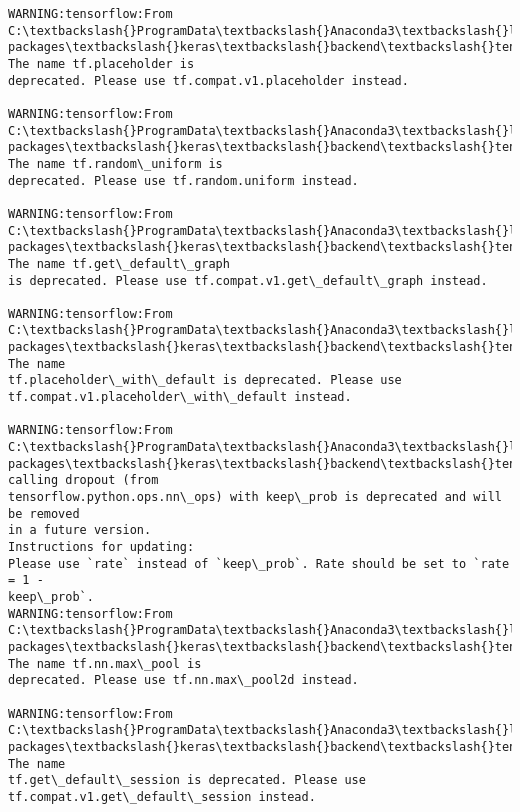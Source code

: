 \documentclass[11pt]{article}
\begin{document}
    \begin{Verbatim}[commandchars=\\\{\}]
WARNING:tensorflow:From C:\textbackslash{}ProgramData\textbackslash{}Anaconda3\textbackslash{}lib\textbackslash{}site-
packages\textbackslash{}keras\textbackslash{}backend\textbackslash{}tensorflow\_backend.py:517: The name tf.placeholder is
deprecated. Please use tf.compat.v1.placeholder instead.

WARNING:tensorflow:From C:\textbackslash{}ProgramData\textbackslash{}Anaconda3\textbackslash{}lib\textbackslash{}site-
packages\textbackslash{}keras\textbackslash{}backend\textbackslash{}tensorflow\_backend.py:4138: The name tf.random\_uniform is
deprecated. Please use tf.random.uniform instead.

WARNING:tensorflow:From C:\textbackslash{}ProgramData\textbackslash{}Anaconda3\textbackslash{}lib\textbackslash{}site-
packages\textbackslash{}keras\textbackslash{}backend\textbackslash{}tensorflow\_backend.py:131: The name tf.get\_default\_graph
is deprecated. Please use tf.compat.v1.get\_default\_graph instead.

WARNING:tensorflow:From C:\textbackslash{}ProgramData\textbackslash{}Anaconda3\textbackslash{}lib\textbackslash{}site-
packages\textbackslash{}keras\textbackslash{}backend\textbackslash{}tensorflow\_backend.py:133: The name
tf.placeholder\_with\_default is deprecated. Please use
tf.compat.v1.placeholder\_with\_default instead.

WARNING:tensorflow:From C:\textbackslash{}ProgramData\textbackslash{}Anaconda3\textbackslash{}lib\textbackslash{}site-
packages\textbackslash{}keras\textbackslash{}backend\textbackslash{}tensorflow\_backend.py:3445: calling dropout (from
tensorflow.python.ops.nn\_ops) with keep\_prob is deprecated and will be removed
in a future version.
Instructions for updating:
Please use `rate` instead of `keep\_prob`. Rate should be set to `rate = 1 -
keep\_prob`.
WARNING:tensorflow:From C:\textbackslash{}ProgramData\textbackslash{}Anaconda3\textbackslash{}lib\textbackslash{}site-
packages\textbackslash{}keras\textbackslash{}backend\textbackslash{}tensorflow\_backend.py:3976: The name tf.nn.max\_pool is
deprecated. Please use tf.nn.max\_pool2d instead.

WARNING:tensorflow:From C:\textbackslash{}ProgramData\textbackslash{}Anaconda3\textbackslash{}lib\textbackslash{}site-
packages\textbackslash{}keras\textbackslash{}backend\textbackslash{}tensorflow\_backend.py:174: The name
tf.get\_default\_session is deprecated. Please use
tf.compat.v1.get\_default\_session instead.


\end{Verbatim}
\end{document}
